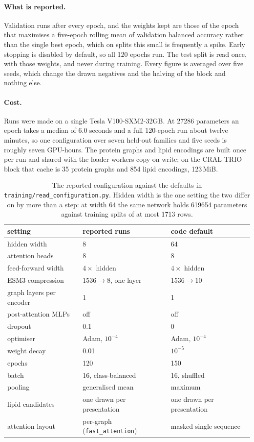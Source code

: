 \paragraph{What is reported.} Validation runs after every epoch, and the weights kept are
those of the epoch that maximises a five-epoch rolling mean of validation balanced
accuracy rather than the single best epoch, which on splits this small is frequently a
spike. Early stopping is disabled by default, so all 120 epochs run. The test split is
read once, with those weights, and never during training. Every figure is averaged over
five seeds, which change the drawn negatives and the halving of the block and nothing
else.

\paragraph{Cost.} Runs were made on a single Tesla V100-SXM2-32GB. At 27286 parameters an
epoch takes a median of 6.0 seconds and a full 120-epoch run about twelve minutes, so one
configuration over seven held-out families and five seeds is roughly seven GPU-hours. The
protein graphs and lipid encodings are built once per run and shared with the loader
workers copy-on-write; on the CRAL-TRIO block that cache is 35 protein graphs and 854
lipid encodings, 123\,MiB.

\begin{table}[htbp]
\centering
\begin{tabular}{lll}
\hline
setting & reported runs & code default \\
\hline
hidden width & 8 & 64 \\
attention heads & 8 & 8 \\
feed-forward width & $4 \times$ hidden & $4 \times$ hidden \\
ESM3 compression & $1536 \to 8$, one layer & $1536 \to 10$ \\
graph layers per encoder & 1 & 1 \\
post-attention MLPs & off & off \\
dropout & 0.1 & 0 \\
optimiser & Adam, $10^{-4}$ & Adam, $10^{-4}$ \\
weight decay & 0.01 & $10^{-5}$ \\
epochs & 120 & 150 \\
batch & 16, class-balanced & 16, shuffled \\
pooling & generalised mean & maximum \\
lipid candidates & one drawn per presentation & one drawn per presentation \\
attention layout & per-graph (\texttt{fast\_attention}) & masked single sequence \\
\hline
\end{tabular}
\caption{The reported configuration against the defaults in
\texttt{training/read\_configuration.py}. Hidden width is the one setting the two differ
on by more than a step: at width 64 the same network holds 619654 parameters against
training splits of at most 1713 rows.}
\label{tab:trainsettings}
\end{table}

